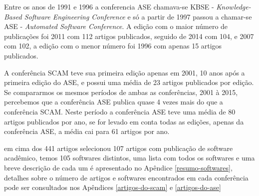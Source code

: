 Entre os anos de 1991 e 1996 a conferencia ASE chamava-se KBSE - {\it
Knowledge-Based Software Engineering Conference} e só a partir de 1997 passou a
chamar-se ASE - {\it Automated Software Conference}. A edição com o maior
número de publicações foi 2011 com 112 artigos publicados, seguido de 2014 com
104, e 2007 com 102, a edição com o menor número foi 1996 com apenas 15 artigos
publicados.

A conferência SCAM teve sua primeira edição apenas em 2001, 10 anos após a
primeira edição do ASE, e possui uma média de 23 artigos publicados por edição.
Se compararmos os mesmos períodos de ambas as conferências, 2001 à 2015,
percebemos que a conferência ASE publica quase 4 vezes mais do que a
conferência SCAM. Neste período a conferência ASE teve uma média de 80 artigos
publicados por ano, se for levado em conta todas as edições, apenas da
conferência ASE, a média cai para 61 artigos por ano.



em cima dos 441 artigos selecionou 107 artigos com publicação de software
acadêmico, temos 105 softwares distintos, uma lista com todos os softwares e
uma breve descrição de cada um é apresentado no Apêndice
\ref{resumo-softwares}, detalhes sobre o número de artigos e softwares
encontrados em cada conferência pode ser consultados nos Apêndices
\ref{artigos-do-scam} e \ref{artigos-do-ase} 

